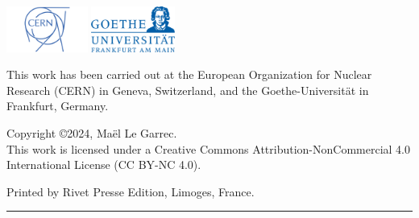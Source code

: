 {{{            %
            \normalfont\fontsize{11pt}{\fontskipsecondtitle}\selectfont%

            \vfill
            \begin{center}
                \includegraphics[height=1.5cm]{./images/CERN-Logo.png}
                \hspace{2.5cm}
                \includegraphics[height=1.5cm]{./images/Goethe-Logo.png}
            \end{center}
            
            \noindent%
            This work has been carried out at the European Organization for Nuclear Research (CERN) in
            Geneva, Switzerland, and the Goethe-Universität in Frankfurt, Germany.\par
            \vspace{0.5cm}%
            \noindent%
            Copyright \copyright 2024, Maël Le Garrec.\\
            This work is licensed under a Creative Commons Attribution-NonCommercial 4.0 International
            License (CC BY-NC 4.0).

            \vspace{1cm}
            \noindent%
            Printed by Rivet Presse Edition, Limoges, France.

            \noindent\rule[0.5em]{\textwidth}{1.5pt}
        }
        \makeatother
        
        \makecopyrightpage
        \restoregeometry
    }
}{}



